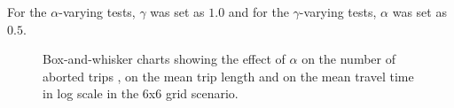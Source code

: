 \documentclass{RITA}
\begin{document}
For the $\alpha$-varying tests, $\gamma$ was set as $1.0$ and for the $\gamma$-varying tests, $\alpha$ was set as $0.5$.

\begin{figure}
  \centering
  \caption{Box-and-whisker charts showing the effect of $\alpha$ on the number of aborted trips , on the mean trip length  and on the mean travel time in log scale  in the 6x6 grid scenario.}
  \label{fig:qLearningAlpha-grid}
\end{figure}
\end{document}
